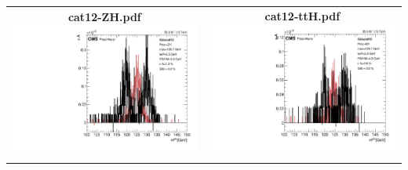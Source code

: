 \begin{longtable}{|c|c|}
{}
 \\
\hline
\parbox{0.49\textwidth}{
\centering
{\bfseries cat12-ZH.pdf}
\includegraphics[width=.49\textwidth]{figures/signal_model/AppendixBdt/signal/Bdt_KF/cat12_ZH.pdf}
}
 & \parbox{0.49\textwidth}{
\centering
{\bfseries cat12-ttH.pdf}
\includegraphics[width=.49\textwidth]{figures/signal_model/AppendixBdt/signal/Bdt_KF/cat12_ttH.pdf}
}
 \\
\hline
\end{longtable}
